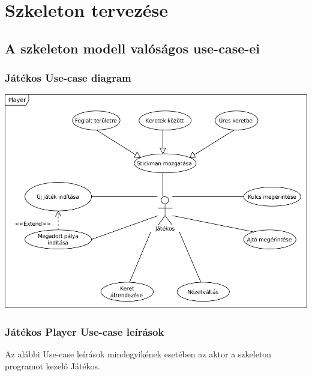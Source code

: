 

\usepackage{enumitem}



\fedlap

\addtocounter{section}{4}
\section{Szkeleton tervezése}

	\subsection{A szkeleton modell valóságos use-case-ei}
        \newcommand{\ucitem}[1]{\item \textbf{Use-case neve: } #1\\}
        \newcommand{\ucdesc}[1]{\textbf{Leírás: } #1\\}
        \newcommand{\ucscenario}[1]{\textbf{Forgatókönyv: }#1\\}
        
		\subsubsection{Játékos Use-case diagram}
		    \begin{center}
			    \includegraphics[scale=0.9]{resources/Player.png}
		    \end{center}
		
		\subsubsection{Játékos Player Use-case leírások}
		    Az alábbi Use-case leírások mindegyikének esetében az aktor a szkeleton programot kezelő Játékos.
		    

